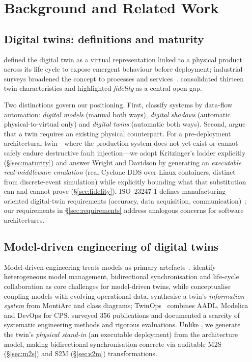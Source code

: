 \section{Background and Related Work}
\label{sec:background}

\subsection{Digital twins: definitions and maturity}

\citet{grieves2017digital} defined the digital twin as a virtual representation linked to a physical product across its life cycle to expose emergent behaviour before deployment; industrial surveys broadened the concept to processes and services~\citep{tao2019}. \citet{jones2020characterising} consolidated thirteen twin characteristics and highlighted \emph{fidelity} as a central open gap.

Two distinctions govern our positioning. First, \citet{kritzinger2018digital} classify systems by data-flow automation: \emph{digital models} (manual both ways), \emph{digital shadows} (automatic physical-to-virtual only) and \emph{digital twins} (automatic both ways). Second, \citet{wright2020tell} argue that a twin requires an existing physical counterpart. For a pre-deployment architectural twin---where the production system does not yet exist or cannot safely endure destructive fault injection---we adopt Kritzinger's ladder explicitly (\S\ref{sec:maturity}) and answer Wright and Davidson by generating an \emph{executable real-middleware emulation} (real Cyclone DDS over Linux containers, distinct from discrete-event simulation) while explicitly bounding what that substitution can and cannot prove (\S\ref{sec:fidelity}). ISO~23247-1 defines manufacturing-oriented digital-twin requirements (accuracy, data acquisition, communication)~\citep{iso23247}; our requirements in \S\ref{sec:requirements} address analogous concerns for software architectures.

\subsection{Model-driven engineering of digital twins}

Model-driven engineering treats models as primary artefacts~\citep{schmidt2006mde}. \citet{bordeleau2020towards} identify heterogeneous model management, bidirectional synchronisation and life-cycle collaboration as core challenges for model-driven twins, while \citet{eramo2022conceptualizing} conceptualise coupling models with evolving operational data. \citet{kirchhof2020model} synthesise a twin's \emph{information system} from MontiArc and class diagrams; TwinOps~\citep{hugues2020twinops} combines AADL, Modelica and DevOps for CPS. \citet{dalibor2022cross} surveyed 356 publications and documented a scarcity of systematic engineering methods and rigorous evaluations. Unlike \citet{kirchhof2020model}, we generate the twin's \emph{physical stand-in} (an executable deployment) from the architecture model, making bidirectional synchronisation concrete via auditable M2S (\S\ref{sec:m2s}) and S2M (\S\ref{sec:s2m}) transformations.

